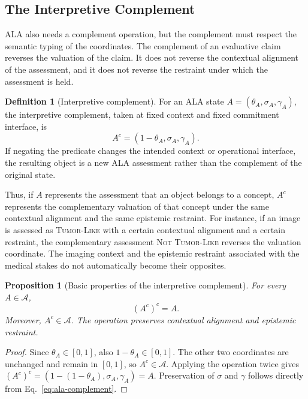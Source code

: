 \documentclass[reqno,final]{amsart}
\theoremstyle{definition}
\newtheorem{definition}{Definition}
\theoremstyle{plain}
\newtheorem{proposition}{Proposition}
\theoremstyle{remark}
\providecommand{\cA}{\mathcal{A}}
\begin{document}
\subsection{The Interpretive Complement}
ALA also needs a complement operation, but the complement must respect the semantic typing of the coordinates. The complement of an evaluative claim reverses the valuation of the claim. It does not reverse the contextual alignment of the assessment, and it does not reverse the restraint under which the assessment is held.

\begin{definition}[Interpretive complement]
For an ALA state \(A=(\theta_A,\sigma_A,\gamma_A)\), the interpretive complement, taken at fixed context and fixed commitment interface, is
\begin{equation}
A^{c}=(1-\theta_A,\sigma_A,\gamma_A).
\label{eq:ala-complement}
\end{equation}
If negating the predicate changes the intended context or operational interface, the resulting object is a new ALA assessment rather than the complement of the original state.
\end{definition}

Thus, if \(A\) represents the assessment that an object belongs to a concept, \(A^c\) represents the complementary valuation of that concept under the same contextual alignment and the same epistemic restraint. For instance, if an image is assessed as \textsc{Tumor-Like} with a certain contextual alignment and a certain restraint, the complementary assessment \textsc{Not Tumor-Like} reverses the valuation coordinate. The imaging context and the epistemic restraint associated with the medical stakes do not automatically become their opposites.

\begin{proposition}[Basic properties of the interpretive complement]
For every \(A\in\cA\),
\[
(A^c)^c=A.
\]
Moreover, \(A^c\in\cA\). The operation preserves contextual alignment and epistemic restraint.
\end{proposition}

\begin{proof}
Since \(\theta_A\in[0,1]\), also \(1-\theta_A\in[0,1]\). The other two coordinates are unchanged and remain in \([0,1]\), so \(A^c\in\cA\). Applying the operation twice gives
\((A^c)^c=(1-(1-\theta_A),\sigma_A,\gamma_A)=A\). Preservation of \(\sigma\) and \(\gamma\) follows directly from Eq.~\eqref{eq:ala-complement}.
\end{proof}
\end{document}
